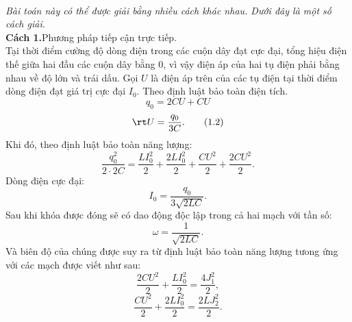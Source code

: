 \begin{loigiai}\\
\textit{Bài toán này có thể được giải bằng nhiều cách khác nhau. Dưới đây là một số cách giải.}\\
\textbf{Cách 1.}Phương pháp tiếp cận trực tiếp.\\
    Tại thời điểm cường độ dòng điện trong các cuộn dây đạt cực đại, tổng hiệu điện thế giữa hai đầu các cuộn dây bằng $0$, vì vậy điện áp của hai tụ điện phải bằng nhau về độ lớn và trái dấu. Gọi $U$ là điện áp trên của các tụ điện tại thời điểm dòng điện đạt giá trị cực đại $I_0$. Theo định luật bảo toàn điện tích.
    \[q_0 = 2CU + CU \tag{1.1} \label{q.11.1.1} \]
    \[\rt U=\dfrac{q_{0}}{3 C}. \tag{1.2} \label{q.11.1.2} \]
    Khi đó, theo định luật bảo toàn năng lượng:
    \[\dfrac{q_{0}^{2}}{2 \cdot 2 C}=\dfrac{L I_{0}^{2}}{2}+\dfrac{2 L I_{0}^{2}}{2}+\dfrac{C U^{2}}{2}+\dfrac{2 C U^{2}}{2}.\tag{1.3} \label{q.11.1.3}\]
    Dòng điện cực đại:
    \[I_{0}=\dfrac{q_{0}}{3 \sqrt{2 L C}}. \tag{1.4} \label{q.11.1.4}\]
    Sau khi khóa được đóng sẽ có dao động độc lập trong cả hai mạch với tần số:
    \[\omega = \dfrac{1}{\sqrt{2 L C}}. \tag{1.5} \label{q.11.1.5}\]
    Và biên độ của chúng được suy ra từ định luật bảo toàn năng lượng tưong ứng với các mạch được viết như sau:
    \[\dfrac{2 C U^{2}}{2}+\dfrac{L I_{0}^{2}}{2} = \dfrac{4 J_{1}^{2}}{2}, \tag{1.6} \label{q.11.1.6}\]
    \[\dfrac{C U^{2}}{2}+\dfrac{2 L I_{0}^{2}}{2} = \dfrac{2 LJ_2^{2}}{2}.\tag{1.7} \label{q.11.1.7}\]
    {


\begin{tikzpicture}[x=0.75pt,y=0.75pt,yscale=-1,xscale=1]


\end{tikzpicture}}
\end{loigiai}
